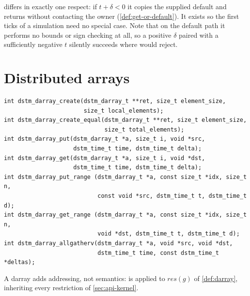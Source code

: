  differs in exactly one respect: if
$t + \delta < 0$ it copies the supplied default and returns without contacting
the owner (\cref{def:get-or-default}). It exists so the first ticks of a
simulation need no special case. Note that on the default path it performs no
bounds or sign checking at all, so a positive $\delta$ paired with a
sufficiently negative $t$ silently succeeds where  would
reject.

\section{Distributed arrays}
\label{sec:api-darray}

\begin{lstlisting}
int dstm_darray_create(dstm_darray_t **ret, size_t element_size,
                       size_t local_elements);
int dstm_darray_create_equal(dstm_darray_t **ret, size_t element_size,
                             size_t total_elements);
int dstm_darray_put(dstm_darray_t *a, size_t i, void *src,
                    dstm_time_t time, dstm_time_t delta);
int dstm_darray_get(dstm_darray_t *a, size_t i, void *dst,
                    dstm_time_t time, dstm_time_t delta);
int dstm_darray_put_range (dstm_darray_t *a, const size_t *idx, size_t n,
                           const void *src, dstm_time_t t, dstm_time_t d);
int dstm_darray_get_range (dstm_darray_t *a, const size_t *idx, size_t n,
                           void *dst, dstm_time_t t, dstm_time_t d);
int dstm_darray_allgatherv(dstm_darray_t *a, void *src, void *dst,
                           dstm_time_t time, const dstm_time_t *deltas);
\end{lstlisting}

A darray adds addressing, not semantics: 
is  applied to $\mathit{res}(g)$ of \cref{def:darray},
inheriting every restriction of \cref{sec:api-kernel}.

